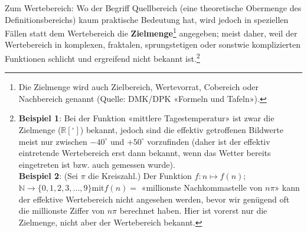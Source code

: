 \begin{bemerkung}{}{}
  Zum Wertebereich: Wo der Begriff Quellbereich (eine theoretische Obermenge
  des Definitionsbereichs) kaum praktische Bedeutung hat,
  wird jedoch in speziellen Fällen statt dem Wertebereich die
  \textbf{Zielmenge}\footnote{Die Zielmenge
    wird auch Zielbereich, Wertevorrat,
    Cobereich oder Nachbereich
    genannt (Quelle: DMK/DPK «Formeln und Tafeln»).}
  angegeben; meist daher, weil der
  Wertebereich in komplexen, fraktalen, sprungstetigen oder sonstwie komplizierten Funktionen schlicht
  und ergreifend nicht bekannt ist.\footnote{\textbf{Beispiel 1}: Bei der Funktion
    «mittlere Tagestemperatur» ist zwar die Zielmenge ($\mathbb{R}[{}^\circ]$)
    bekannt, jedoch sind die effektiv getroffenen Bildwerte meist nur
    zwischen $-40^\circ$ und $+50^\circ$ vorzufinden (daher ist der
    effektiv eintretende Wertebereich erst dann bekannt, wenn das Wetter
    bereits eingetreten ist bzw. auch gemessen wurde). \\
    \textbf{Beispiel 2}: (Sei $\pi$ die Kreiszahl.) Der Funktion $f: n\mapsto f(n)$; $\mathbb{N} \rightarrow \{0, 1, 2, 3, ..., 9\} \textrm{mit} f(n) = $
    «millionste Nachkommastelle von $n\pi$»
    kann der effektive Wertebereich nicht
  angesehen werden, bevor wir genügend oft die millionste Ziffer von
  $n\pi$ berechnet haben. Hier ist vorerst nur die Zielmenge, nicht
  aber der Wertebereich bekannt.}
\end{bemerkung}



\newpage


